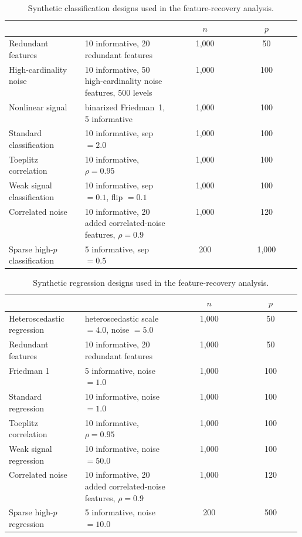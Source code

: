 \begin{table}[H]
  \centering
  \scriptsize
  \setlength{\tabcolsep}{4pt}
  \begin{tabular}{@{}L{0.26\linewidth}L{0.32\linewidth}S[table-format=4.0]S[table-format=4.0]@{}}
    \toprule
     &  & {$n$} & {$p$} \\
    \midrule
    Redundant features & 10 informative, 20 redundant features & 1,000 & 50 \\
    High-cardinality noise & 10 informative, 50 high-cardinality noise features, 500 levels & 1,000 & 100 \\
    Nonlinear signal & binarized Friedman~1, 5 informative & 1,000 & 100 \\
    Standard classification & 10 informative, sep $= 2.0$ & 1,000 & 100 \\
    Toeplitz correlation & 10 informative, $\rho = 0.95$ & 1,000 & 100 \\
    Weak signal classification & 10 informative, sep $= 0.1$, flip $= 0.1$ & 1,000 & 100 \\
    Correlated noise & 10 informative, 20 added correlated-noise features, $\rho = 0.9$ & 1,000 & 120 \\
    Sparse high-$p$ classification & 5 informative, sep $= 0.5$ & 200 & 1,000 \\
    \bottomrule
  \end{tabular}
  \caption{Synthetic classification designs used in the feature-recovery
  analysis.}
  \label{tab:synthetic-dataset-inventory-clf}
\end{table}

\begin{table}[H]
  \centering
  \scriptsize
  \setlength{\tabcolsep}{4pt}
  \begin{tabular}{@{}L{0.26\linewidth}L{0.32\linewidth}S[table-format=4.0]S[table-format=3.0]@{}}
    \toprule
     &  & {$n$} & {$p$} \\
    \midrule
    Heteroscedastic regression & heteroscedastic scale $= 4.0$, noise $= 5.0$ & 1,000 & 50 \\
    Redundant features & 10 informative, 20 redundant features & 1,000 & 50 \\
    Friedman 1 & 5 informative, noise $= 1.0$ & 1,000 & 100 \\
    Standard regression & 10 informative, noise $= 1.0$ & 1,000 & 100 \\
    Toeplitz correlation & 10 informative, $\rho = 0.95$ & 1,000 & 100 \\
    Weak signal regression & 10 informative, noise $= 50.0$ & 1,000 & 100 \\
    Correlated noise & 10 informative, 20 added correlated-noise features, $\rho = 0.9$ & 1,000 & 120 \\
    Sparse high-$p$ regression & 5 informative, noise $= 10.0$ & 200 & 500 \\
    \bottomrule
  \end{tabular}
  \caption{Synthetic regression designs used in the feature-recovery analysis.}
  \label{tab:synthetic-dataset-inventory-reg}
\end{table}
